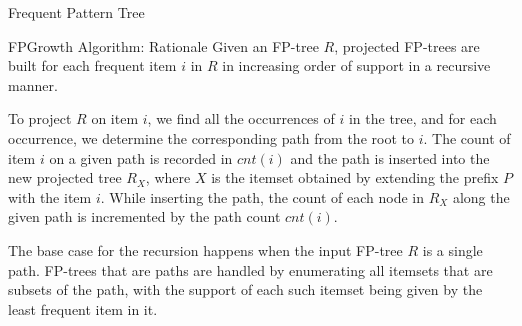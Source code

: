 \begin{frame}{Frequent Pattern Tree}
{{{      
    }
   }
  \hspace{0.2in}
    \label{fig:fpm:iset:APT5}
    \scalebox{0.4}{%
    \pstree[]{\Toval[edge=\bedge]{$\emptyset(5)$}}{
      \pstree[]{\Toval[edge=\bedge]{$B$(5)}}{
        \pstree[]{\Toval[edge=\bedge]{$E$(5)}}{
          \pstree[]{\Toval[edge=\bedge]{$A$(4)}}{
            \pstree{\Toval[edge=\bedge]{$C$(2)}}{
              \Toval[edge=\bedge]{$D$(1)}
            }
            \Toval{$D$(2)}
          }
          \Toval{$C$(1)}
       }
      }
    }
  }
  \hspace{0.2in}
    \label{fig:fpm:iset:APT6}
  }
\end{frame}


\begin{frame}{FPGrowth Algorithm: Rationale}
Given an FP-tree $R$, projected FP-trees are built for each
frequent item $i$ in $R$ in increasing order of support in a recursive
manner.

\medskip
To project $R$ on item $i$, we f\/{i}nd
all the occurrences of $i$ in the tree, and for each occurrence,
we determine the corresponding path from the root to $i$.
The count of item $i$ on a given
path is recorded in $cnt(i)$
and the
path is inserted into the new projected tree $R_X$, where $X$ is
the itemset obtained by extending the pref\/{i}x $P$ with the item
$i$.  While inserting the path, the count of each node in $R_X$ along
the given path is incremented by the path count $cnt(i)$.


\medskip
The base case
for the recursion happens when the input FP-tree $R$ is a single
path. FP-trees that are paths are handled by enumerating all
itemsets that are subsets of the path, with the support of each
such itemset being given by the least frequent item in it.

\end{frame}


